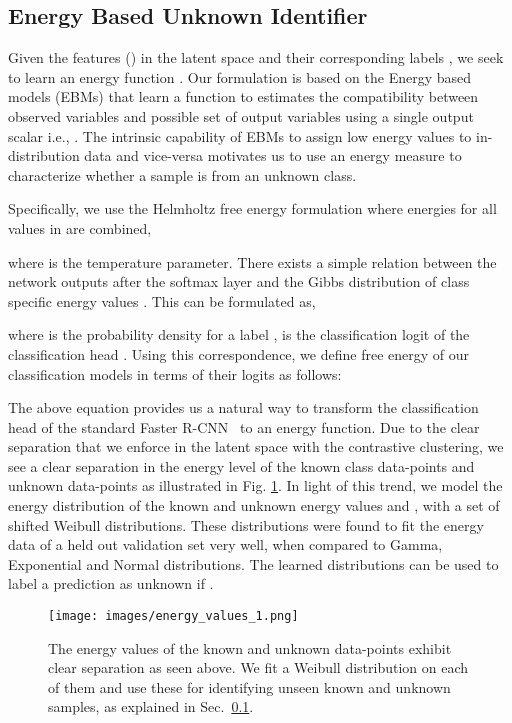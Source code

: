 \documentclass[final]{cvpr}
\begin{document}
\subsection{Energy Based Unknown Identifier}\label{sec:energy_based_unk_identification}

Given the features () in the latent space  and their corresponding labels , we seek to learn an energy function . Our formulation is based on the Energy based models (EBMs) \cite{lecun2006tutorial} that learn a function  to estimates the compatibility between observed variables  and possible set of output variables  using a single output scalar i.e., . 
The intrinsic capability of EBMs to assign low energy values to in-distribution data and vice-versa motivates us to use an energy measure to characterize whether a sample is from an unknown class.


Specifically, we use the Helmholtz free energy formulation where energies for all values in  are combined,

where  is the temperature parameter. There exists a simple relation between the network outputs after the softmax layer and the Gibbs distribution of class specific energy values \cite{liu2020energy}. This can be formulated as, 

where  is the probability density for a label ,  is the  classification logit of the classification head . Using this correspondence, we define free energy of our classification models in terms of their logits as follows:
\vspace{-5pt}

The above equation provides us a natural way to transform the classification head of the standard Faster R-CNN~\cite{ren2015faster} to an energy function. Due to the clear separation that we enforce in the latent space with the contrastive clustering, we see a clear separation in the energy level of the known class data-points and unknown data-points as illustrated in Fig. \ref{fig:energy_plots}. In light of this trend, we model the energy distribution of the known and unknown energy values   and , with a set of shifted Weibull distributions. These distributions were found to fit the energy data of a held out validation set very well, when compared to Gamma, Exponential and Normal distributions. The learned distributions can be used to label a prediction as unknown if .

\begin{figure}[t]
\centering
\texttt{[image: images/energy\_values\_1.png]}
\vspace{-13pt}
\caption{\small
The energy values of the known and unknown data-points exhibit clear separation as seen above. We fit a Weibull distribution on each of them and use these for identifying unseen known and unknown samples, as explained in Sec.~\ref{sec:energy_based_unk_identification}.}
\label{fig:energy_plots}
\end{figure}
\end{document}
